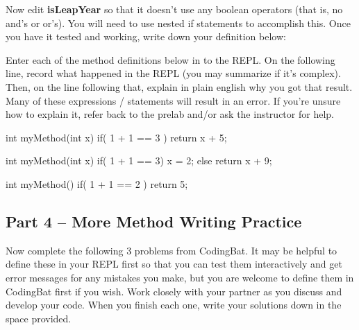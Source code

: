 \begin{exer}
Now edit \textbf{isLeapYear} so that it doesn't use any boolean operators (that is, no and's or or's). You will need to use nested if statements to accomplish this. Once you have it tested and working, write down your definition below:

\evallinefive
\end{exer}


\begin{eval}
Enter each of the method definitions below in to the REPL. On the following line, record what happened in the REPL (you may summarize if it's complex). Then, on the line following that, explain in plain english why you got that result. Many of these expressions / statements will result in 
an error. If you're unsure how to explain it, refer back to the prelab and/or ask the instructor for help.

\begin{sevalenum}


\item 
\begin{code}
int myMethod(int x) { 
  if( 1 + 1 == 3 ) {
    return x + 5; 
  } 
}
\end{code}

\evallinetwo

\item 
\begin{code}
int myMethod(int x) { 
  if( 1 + 1 == 3) {
    x = 2;
  } else {
    return x + 9;
  }
}
\end{code}

\evallinetwo

\item 
\begin{code}
int myMethod() { 
  if( 1 + 1 == 2 ) {
    return 5; 
  } 
}
\end{code}

\evallinetwo


\end{sevalenum}
\end{eval}

\initialbox


\subsection{Part 4 -- More Method Writing Practice}

Now complete the following 3 problems from CodingBat. It may be helpful to define these in your REPL first so that you can test them interactively and get error messages for any mistakes you make, but you are welcome to define them in CodingBat first if you wish. Work closely with your partner as you discuss and develop your code. When you finish each one, write your solutions down in the space provided. 


